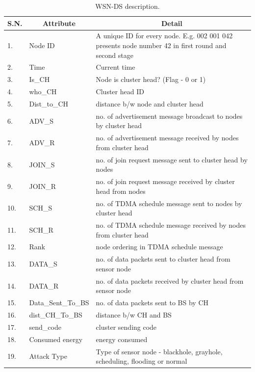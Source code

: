 \begin{longtable}[c]{|p{0.5in}|p{1.5in}|p{3.5in}|}
\caption{WSN-DS description.}
\label{tab:WSNDS}\\
\hline
\multicolumn{1}{|c|}{\textbf{S.N.}} & \multicolumn{1}{c|}{\textbf{Attribute}} & \multicolumn{1}{c|}{\textbf{Detail}} \\ \hline
\endfirsthead
%
\endhead
%
1. & Node ID & A unique ID for every node. E.g. 002 001 042 presents node number 42 in first round and second stage \\ \hline
2. & Time & Current time \\ \hline
3. & Is\_CH & Node is cluster head? (Flag - 0 or 1) \\ \hline
4. & who\_CH & Cluster head ID \\ \hline
5. & Dist\_to\_CH & distance b/w node and cluster head \\ \hline
6. & ADV\_S & no. of advertisement message broadcast to nodes by cluster head \\ \hline
7. & ADV\_R & no. of advertisement message received by nodes from cluster head \\ \hline
8. & JOIN\_S & no. of join request message sent to cluster head by nodes \\ \hline
9. & JOIN\_R & no. of join request message received by cluster head from nodes \\ \hline
10. & SCH\_S & no. of TDMA schedule message sent to nodes by cluster head \\ \hline
11. & SCH\_R & no. of TDMA schedule message received by nodes from cluster head \\ \hline
12. & Rank & node ordering in TDMA schedule message \\ \hline
13. & DATA\_S & no. of data packets sent to cluster head from sensor node \\ \hline
14. & DATA\_R & no. of data packets received by cluster head from sensor node \\ \hline
15. & Data\_Sent\_To\_BS & no. of data packets sent to BS by CH \\ \hline
16. & dist\_CH\_To\_BS & distance b/w CH and BS \\ \hline
17. & send\_code & cluster sending code \\ \hline
18. & Consumed energy & energy consumed \\ \hline
19. & Attack Type & Type of sensor node - blackhole, grayhole, scheduling, flooding or normal \\ \hline
\end{longtable}



